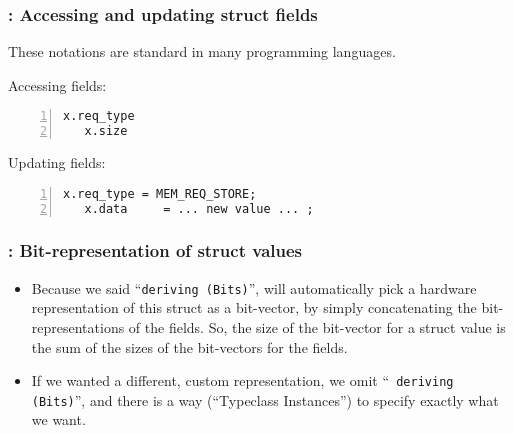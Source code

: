 
\begin{frame}[fragile]
\frametitle{{\BSV}: Accessing and updating struct fields}

\footnotesize

These notations are standard in many programming languages.

\vspace{5ex}

Accessing fields:
\begin{Verbatim}[frame=single, numbers=left]
   x.req_type
   x.size
\end{Verbatim}

\vspace{5ex}

Updating fields:
\begin{Verbatim}[frame=single, numbers=left]
   x.req_type = MEM_REQ_STORE;
   x.data     = ... new value ... ;
\end{Verbatim}

\end{frame}


\begin{frame}[fragile]
\frametitle{{\BSV}: Bit-representation of struct values}

\footnotesize

\begin{itemize}

 \item Because we said ``{\tt deriving (Bits)}'', {\bsc} will
       automatically pick a hardware representation of this struct as
       a bit-vector, by simply concatenating the bit-representations
       of the fields.  So, the size of the bit-vector for a struct
       value is the sum of the sizes of the bit-vectors for the
       fields.

 \PAUSE{\vspace{4ex}}

 \item If we wanted a different, custom representation, we omit ``{\tt
       deriving (Bits)}'', and there is a way (``Typeclass
       Instances'') to specify exactly what we want.

\end{itemize}

\end{frame}


